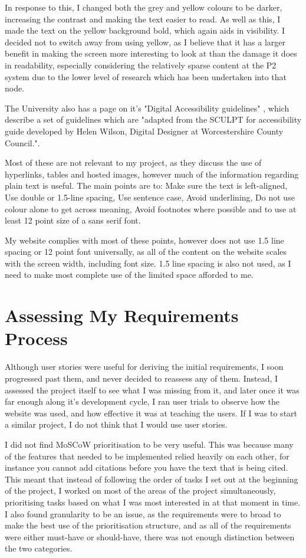 \documentclass{l4proj}
\begin{document}
In response to this, I changed both the grey and yellow colours to be darker, increasing the contrast and making the text easier to read.  As well as this, I made the text on the yellow background bold, which again aids in visibility.  I decided not to switch away from using yellow, as I believe that it has a larger benefit in making the screen more interesting to look at than the damage it does in readability, especially considering the relatively sparse content at the P2 system due to the lower level of research which has been undertaken into that node.

The University also has a page on it's "Digital Accessibility guidelines" \cite{digital_accessibility}, which describe a set of guidelines which are "adapted from the SCULPT for accessibility guide developed by Helen Wilson, Digital Designer at Worcestershire County Council."\cite{sculpt}.

Most of these are not relevant to my project, as they discuss the use of hyperlinks, tables and hosted images, however much of the information regarding plain text is useful.  The main points are to: Make sure the text is left-aligned, Use double or 1.5-line spacing, Use sentence case, Avoid underlining, Do not use colour alone to get across meaning, Avoid footnotes where possible and to use at least 12 point size of a sans serif font.

My website complies with most of these points, however does not use 1.5 line spacing or 12 point font universally, as all of the content on the website scales with the screen width, including font size.  1.5 line spacing is also not used, as I need to make most complete use of the limited space afforded to me.

\section{Assessing My Requirements Process}

Although user stories were useful for deriving the initial requirements, I soon progressed past them, and never decided to reassess any of them.  Instead, I assessed the project itself to see what I was missing from it, and later once it was far enough along it's development cycle, I ran user trials to observe how the website was used, and how effective it was at teaching the users.  If I was to start a similar project, I do not think that I would use user stories.

I did not find MoSCoW prioritisation to be very useful.  This was because many of the features that needed to be implemented relied heavily on each other, for instance you cannot add citations before you have the text that is being cited.  This meant that instead of following the order of tasks I set out at the beginning of the project, I worked on most of the areas of the project simultaneously, prioritising tasks based on what I was most interested in at that moment in time.  I also found granularity to be an issue, as the requirements were to broad to make the best use of the prioritisation structure, and as all of the requirements were either must-have or should-have, there was not enough distinction between the two categories.
\end{document}
